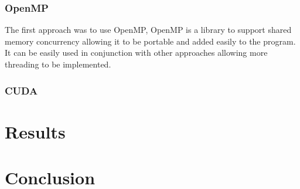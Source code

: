 \documentclass[12pt]{article}
\begin{document}
\subsubsection{OpenMP}
The first approach was to use OpenMP, OpenMP is a library to support shared memory concurrency allowing it to be portable and added easily to the program. It can  be easily used in conjunction with other approaches allowing more threading to be implemented.
\subsubsection{CUDA}


\section{Results}

\section{Conclusion}


	
\end{document}
